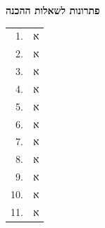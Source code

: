 \documentclass[11pt]{article}
\begin{document}
{\LARGE\bfseries פתרונות לשאלות ההכנה}\par

\begin{tabular}{rl}
1. & א \\
2. & א \\
3. & א \\
4. & א \\
5. & א \\
6. & א \\
7. & א \\
8. & א \\
9. & א \\
10. & א \\
11. & א \\
\end{tabular}
\end{document}
